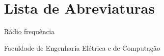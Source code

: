 \chapter*{Lista de Abreviaturas}
\thispagestyle{empty}

\begin{description}[labelwidth=2cm]
\item[RF] Rádio frequência
\item[FEEC] Faculdade de Engenharia Elétrica e de Computação
\end{description}

